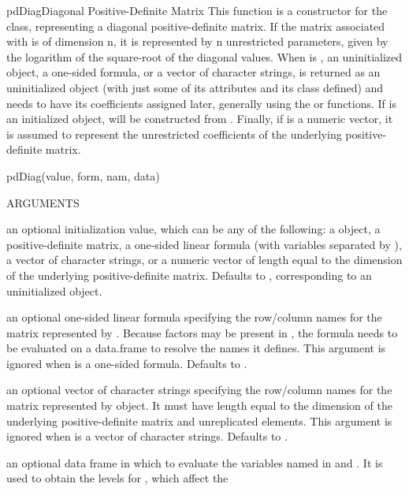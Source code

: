 \documentclass[pdftex]{article} \usepackage{url,graphicx}
\begin{document}
\begin{Helpfile}{pdDiag}{Diagonal Positive-Definite Matrix}
This function is a constructor for the  class,
representing a diagonal positive-definite matrix. If the matrix
associated with  is of dimension n, it is
represented by n unrestricted parameters, given by the logarithm
of the square-root of the diagonal values. When  is
, an uninitialized  object, a one-sided
formula, or a vector of character strings,  is returned
as an uninitialized  object (with just some of its
attributes and its class defined) and needs to have its coefficients
assigned later, generally using the  or 
functions. If  is an initialized  object,
 will be constructed from
. Finally, if  is a numeric vector,
it is assumed to represent the unrestricted coefficients of the
underlying positive-definite
matrix.
\begin{Example}
pdDiag(value, form, nam, data)
\end{Example}
\begin{Argument}{ARGUMENTS}
\item[\Co{value:}]
an optional initialization value, which can be any of the
following: a  object, a positive-definite
matrix, a one-sided linear formula (with variables separated by
\Co{+}), a vector of character strings, or a numeric
vector of length equal to the dimension of the underlying
positive-definite matrix. Defaults to , corresponding
to an uninitialized object.
\item[\Co{form:}]
an optional one-sided linear formula specifying the
row/column names for the matrix represented by . Because
factors may be present in , the formula needs to be
evaluated on a data.frame to resolve the names it defines. This
argument is ignored when  is a one-sided
formula. Defaults to .
\item[\Co{nam:}]
an optional vector of character strings specifying the
row/column names for the matrix represented by object. It must have 
length equal to the dimension of the underlying positive-definite
matrix and unreplicated elements. This argument is ignored when
 is a vector of character strings. Defaults to
.
\item[\Co{data:}]
an optional data frame in which to evaluate the variables
named in  and . It is used to
obtain the levels for , which affect the

\end{Argument}
\end{Helpfile}
\end{document}
